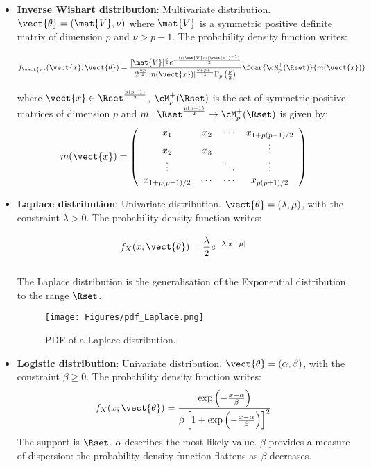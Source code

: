 {\begin{itemize}
\item {\bf Inverse Wishart distribution}: Multivariate distribution. $\vect{\theta} = \left( \mat{V},\nu \right)$ where $\mat{V}$ is a symmetric positive definite matrix of dimension $p$ and $\nu>p-1$. The probability density function writes:
\begin{equation}
f_{\vect{x}}(\vect{x};\vect{\theta}) = \frac{|\mat{V}|^{\frac{\nu}{2}}e^{-\frac{\mathrm{tr}(\mat{V}m(\vect{x})^{-1})^{\strut}}{2}}}{2^{\frac{\nu p}{2}}|m(\vect{x})|^{\frac{\nu+p+1}{2}}\Gamma_p\left(\frac{\nu}{2}\right)_{\strut}}\fcar{\cM_p^+(\Rset)}{m(\vect{x})}
\end{equation}
where $\vect{x}\in\Rset^{\frac{p(p+1)}{2}}$, $\cM_p^+(\Rset)$ is the set of symmetric positive matrices of dimension $p$ and $m:\Rset^{\frac{p(p+1)}{2}}\rightarrow\cM_p^+(\Rset)$ is given by:
\begin{align}
  m(\vect{x})=\left(\begin{array}{cccc}
x_1 & x_2 & \cdots &  x_{1+p(p-1)/2}\\
x_2 & x_3 &  & \vdots \\
\vdots & & \ddots & \vdots\\
x_{1+p(p-1)/2} & \cdots & \cdots & x_{p(p+1)/2}
\end{array}
\right)
\end{align}

\item {\bf Laplace distribution}: Univariate distribution. $\vect{\theta} = \left( \lambda, \mu \right)$, with the constraint $\lambda>0$. The probability density function writes:
\begin{equation}
f_X(x;\vect{\theta}) = \displaystyle \frac{\lambda^{\strut}}{2_{\strut}}e^{-\lambda |x-\mu|}
\end{equation}

The Laplace distribution is the generalisation of the Exponential distribution to the range $\Rset$.

\begin{figure}[H]
\begin{center}
\texttt{[image: Figures/pdf\_Laplace.png]}
\caption{PDF of a Laplace distribution.}
\end{center}
\end{figure}





\item {\bf Logistic distribution}: Univariate distribution. $\vect{\theta} = \left(\alpha,\beta \right)$, with the constraint $\beta \geq 0$. The probability density function writes:
\begin{equation}
f_X(x;\vect{\theta}) = \frac{\exp \left( -\frac{x-\alpha}{\beta} \right)}{\beta \left[ 1+\exp \left( -\frac{x-\alpha}{\beta} \right) \right]^2}
\end{equation}
The support is $\Rset$. $\alpha$ describes the most likely value. $\beta$ provides a measure of dispersion: the probability density function flattens as $\beta$ decreases.


\end{itemize}}
